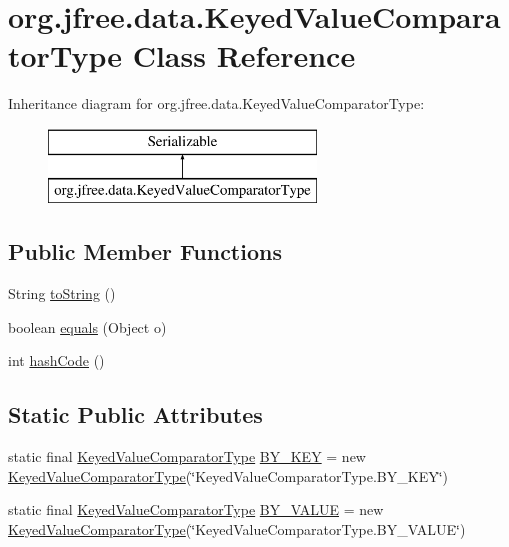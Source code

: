\hypertarget{classorg_1_1jfree_1_1data_1_1_keyed_value_comparator_type}{}\section{org.\+jfree.\+data.\+Keyed\+Value\+Comparator\+Type Class Reference}
\label{classorg_1_1jfree_1_1data_1_1_keyed_value_comparator_type}
Inheritance diagram for org.\+jfree.\+data.\+Keyed\+Value\+Comparator\+Type\+:\begin{figure}[H]
\begin{center}
\leavevmode
\includegraphics[height=2.000000cm]{classorg_1_1jfree_1_1data_1_1_keyed_value_comparator_type}
\end{center}
\end{figure}
\subsection*{Public Member Functions}
\begin{DoxyCompactItemize}
\item 
String \mbox{\hyperlink{classorg_1_1jfree_1_1data_1_1_keyed_value_comparator_type_a1536f92551f46ccb0e4445ac53870cdc}{to\+String}} ()
\item 
boolean \mbox{\hyperlink{classorg_1_1jfree_1_1data_1_1_keyed_value_comparator_type_ac6e304dd2b76db6c3dde3608aef370cc}{equals}} (Object o)
\item 
int \mbox{\hyperlink{classorg_1_1jfree_1_1data_1_1_keyed_value_comparator_type_ae4a54a1e7ba78a70f7feea6ebf24fde9}{hash\+Code}} ()
\end{DoxyCompactItemize}
\subsection*{Static Public Attributes}
\begin{DoxyCompactItemize}
\item 
static final \mbox{\hyperlink{classorg_1_1jfree_1_1data_1_1_keyed_value_comparator_type}{Keyed\+Value\+Comparator\+Type}} \mbox{\hyperlink{classorg_1_1jfree_1_1data_1_1_keyed_value_comparator_type_ac5df03e5f8e338a909ebcf50ec4c72b7}{B\+Y\+\_\+\+K\+EY}} = new \mbox{\hyperlink{classorg_1_1jfree_1_1data_1_1_keyed_value_comparator_type}{Keyed\+Value\+Comparator\+Type}}(\char`\"{}Keyed\+Value\+Comparator\+Type.\+B\+Y\+\_\+\+K\+EY\char`\"{})
\item 
static final \mbox{\hyperlink{classorg_1_1jfree_1_1data_1_1_keyed_value_comparator_type}{Keyed\+Value\+Comparator\+Type}} \mbox{\hyperlink{classorg_1_1jfree_1_1data_1_1_keyed_value_comparator_type_a84a661d687117e2a686bf23978745b81}{B\+Y\+\_\+\+V\+A\+L\+UE}} = new \mbox{\hyperlink{classorg_1_1jfree_1_1data_1_1_keyed_value_comparator_type}{Keyed\+Value\+Comparator\+Type}}(\char`\"{}Keyed\+Value\+Comparator\+Type.\+B\+Y\+\_\+\+V\+A\+L\+UE\char`\"{})
\end{DoxyCompactItemize}


